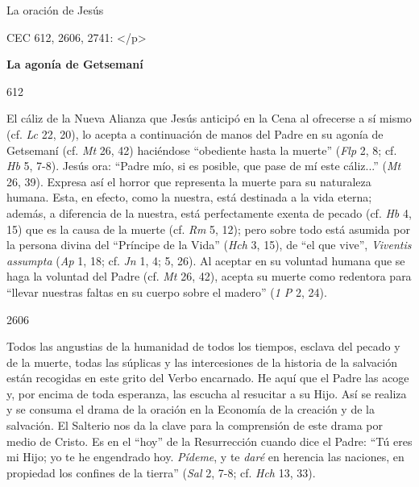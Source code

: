 			\begin{ccetheme}La oración de Jesús \end{ccetheme}
			
			\begin{ccereference}\end{ccereference}CEC 612, 2606, 2741: </p>
			
			\begin{ccebody}\textbf{La agonía de Getsemaní}\end{ccebody}
			
			\begin{ccebody}\begin{ccenumber}612\end{ccenumber} El cáliz de la Nueva Alianza que Jesús anticipó en la Cena al ofrecerse a sí mismo (cf. \textit{Lc} 22, 20), lo acepta a continuación de manos del Padre en su agonía de Getsemaní (cf. \textit{Mt} 26, 42) haciéndose “obediente hasta la muerte” (\textit{Flp} 2, 8; cf. \textit{Hb} 5, 7-8). Jesús ora: “Padre mío, si es posible, que pase de mí este cáliz...” (\textit{Mt} 26, 39). Expresa así el horror que representa la muerte para su naturaleza humana. Esta, en efecto, como la nuestra, está destinada a la vida eterna; además, a diferencia de la nuestra, está perfectamente exenta de pecado (cf. \textit{Hb} 4, 15) que es la causa de la muerte (cf. \textit{Rm} 5, 12); pero sobre todo está asumida por la persona divina del “Príncipe de la Vida” (\textit{Hch} 3, 15), de “el que vive”, \textit{Viventis assumpta} (\textit{Ap} 1, 18; cf. \textit{Jn} 1, 4; 5, 26). Al aceptar en su voluntad humana que se haga la voluntad del Padre (cf. \textit{Mt} 26, 42), acepta su muerte como redentora para “llevar nuestras faltas en su cuerpo sobre el madero” (\textit{1 P} 2, 24).\end{ccebody}
			
			\begin{ccebody}\begin{ccenumber}2606\end{ccenumber} Todos las angustias de la humanidad de todos los tiempos, esclava del pecado y de la muerte, todas las súplicas y las intercesiones de la historia de la salvación están recogidas en este grito del Verbo encarnado. He aquí que el Padre las acoge y, por encima de toda esperanza, las escucha al resucitar a su Hijo. Así se realiza y se consuma el drama de la oración en la Economía de la creación y de la salvación. El Salterio nos da la clave para la comprensión de este drama por medio de Cristo. Es en el “hoy” de la Resurrección cuando dice el Padre: “Tú eres mi Hijo; yo te he engendrado hoy. \textit{Pídeme}, y te \textit{daré} en herencia las naciones, en propiedad los confines de la tierra” (\textit{Sal} 2, 7-8; cf. \textit{Hch} 13, 33).\end{ccebody}
			

